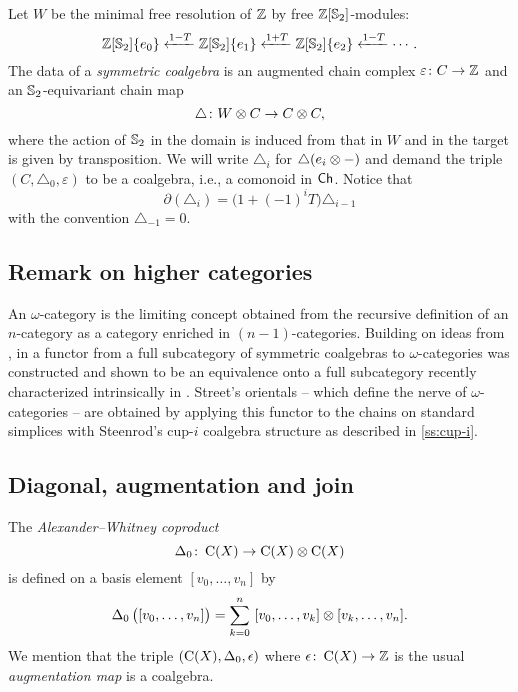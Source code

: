 Let $W$ be the minimal free resolution of $\mathbb{Z}$ by free $\mathbb{Z}[\mathbb{S}_2]$-modules:
\[
\mathbb{Z}[\mathbb{S}_2]\{e_0\} \xleftarrow{1-T} \mathbb{Z}[\mathbb{S}_2]\{e_1\} \xleftarrow{1+T} \mathbb{Z}[\mathbb{S}_2]\{e_2\} \xleftarrow{1-T} \dotsb.
\]
The data of a \textit{symmetric coalgebra} is an augmented chain complex $\varepsilon \colon C \to \mathbb{Z}$ and an $\mathbb{S}_2$-equivariant chain map
\[
\triangle \colon W \otimes C \to C \otimes C,
\]
where the action of $\mathbb{S}_2$ in the domain is induced from that in $W$ and in the target is given by transposition.
We will write $\triangle_i$ for $\triangle(e_i \otimes -)$ and demand the triple $(C, \triangle_0, \varepsilon)$ to be a coalgebra, i.e.,
a comonoid in $\mathsf{Ch}$.
Notice that
\[
\partial(\triangle_i) = \big( 1+(-1)^i T \big) \triangle_{i-1}
\]
with the convention $\triangle_{-1} = 0$.

\subsection{Remark on higher categories}
\label{ss:higher categories}

An $\omega$-category is the limiting concept obtained from the recursive definition of an $n$-category as a category enriched in $(n-1)$-categories.
Building on ideas from \cite{brown1981cubes, kapranov1991polycategory, steiner2004omega}, in \cite{medina2020globular} a functor from a full subcategory of symmetric coalgebras to $\omega$-categories was constructed and shown to be an equivalence onto a full subcategory recently characterized intrinsically in \cite{ozornova2022steiner}.
Street's orientals \cite{street1987orientals} -- which define the nerve of $\omega$-categories -- are obtained by applying this functor to the chains on standard simplices with Steenrod's cup-$i$ coalgebra structure as described in \cref{ss:cup-i}.

\subsection{Diagonal, augmentation and join}

The \textit{Alexander--Whitney coproduct}
\[
\operatorname{\Delta}_0 \colon \operatorname{C}(X) \to \operatorname{C}(X) \otimes \operatorname{C}(X)
\]
is defined on a basis element $[v_0, \dots, v_n]$ by
\begin{equation*}\label{e:alexander-whitney coalgebra}
	\operatorname{\Delta}_0 \big( [v_0, \dots, v_n] \big) =
	\sum_{k=0}^n \ [v_0, \dots, v_k] \otimes [v_k, \dots, v_n].
\end{equation*}
We mention that the triple $(\operatorname{C}(X), \operatorname{\Delta}_0, \operatorname{\epsilon})$ where $\operatorname{\epsilon} \colon \operatorname{C}(X) \to \mathbb{Z}$ is the usual \textit{augmentation map} is a coalgebra.

